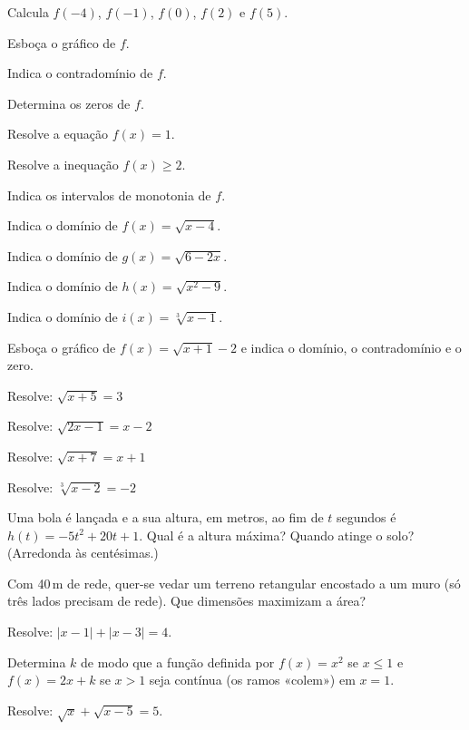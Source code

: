 \documentclass[12pt]{article}
\begin{document}
\begin{exercicios}
  \item Calcula $f(-4)$, $f(-1)$, $f(0)$, $f(2)$ e $f(5)$.
  \item Esboça o gráfico de $f$.
  \item Indica o contradomínio de $f$.
  \item Determina os zeros de $f$.
  \item Resolve a equação $f(x) = 1$.
  \item Resolve a inequação $f(x) \ge 2$.
  \item Indica os intervalos de monotonia de $f$.
\end{exercicios}

\begin{exercicios}
  \item Indica o domínio de $f(x) = \sqrt{x - 4}$.
  \item Indica o domínio de $g(x) = \sqrt{6 - 2x}$.
  \item Indica o domínio de $h(x) = \sqrt{x^2 - 9}$.
  \item Indica o domínio de $i(x) = \sqrt[3]{x - 1}$.
  \item Esboça o gráfico de $f(x) = \sqrt{x + 1} - 2$ e indica o domínio, o contradomínio e o zero.
  \item Resolve: $\sqrt{x + 5} = 3$
  \item Resolve: $\sqrt{2x - 1} = x - 2$
  \item Resolve: $\sqrt{x + 7} = x + 1$
  \item Resolve: $\sqrt[3]{x - 2} = -2$
\end{exercicios}

\begin{exercicios}
  \item Uma bola é lançada e a sua altura, em metros, ao fim de $t$ segundos é $h(t) = -5t^2 + 20t + 1$. Qual é a altura máxima? Quando atinge o solo? (Arredonda às centésimas.)
  \item Com 40\,m de rede, quer-se vedar um terreno retangular encostado a um muro (só três lados precisam de rede). Que dimensões maximizam a área?
  \item Resolve: $|x - 1| + |x - 3| = 4$.
  \item Determina $k$ de modo que a função definida por $f(x) = x^2$ se $x \le 1$ e $f(x) = 2x + k$ se $x > 1$ seja contínua (os ramos «colem») em $x = 1$.
  \item Resolve: $\sqrt{x} + \sqrt{x - 5} = 5$.
\end{exercicios}
\end{document}
